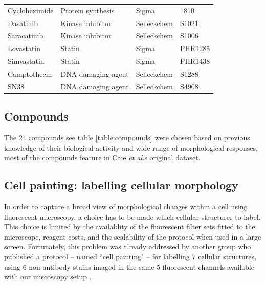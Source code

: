 \documentclass[a4paper,11pt,twoside,openright]{scrbook}
\begin{document}
\begin{table}[]
\begin{footnotesize}
\begin{tabular}{@{}llll@{}}
    Cycloheximide   & Protein synthesis      & Sigma       & 1810        \\
    Dasatinib       & Kinase inhibitor       & Selleckchem & S1021       \\
    Saracatinib     & Kinase inhibitor       & Selleckchem & S1006       \\
    Lovastatin      & Statin                 & Sigma       & PHR1285     \\
    Simvastatin     & Statin                 & Sigma       & PHR1438     \\
    Camptothecin    & DNA damaging agent     & Selleckchem & S1288       \\
    SN38            & DNA damaging agent     & Selleckchem & S4908       \\ \bottomrule
    \end{tabular}
    \end{footnotesize}
\end{table}





\subsection{Compounds}
The 24 compounds see table \ref{table:compounds} were chosen based on previous knowledge of their biological activity and wide range of morphological responses, most of the compounds feature in Caie \textit{et al.}s original dataset.


\subsection{Cell painting: labelling cellular morphology}
In order to capture a broad view of morphological changes within a cell using fluorescent microscopy, a choice has to be made which cellular structures to label.
This choice is limited by the availablity of the fluorescent filter sets fitted to the microscope, reagent costs, and the scalability of the protocol when used in a large screen.
Fortunately, this problem was already addressed by another group who published a protocol -- named ``cell painting" -- for labelling 7 cellular structures, using 6 non-antibody stains imaged in the same 5 fluorescent channels available with our miscoscopy setup \cite{Gustafsdottir2013, Bray2016}.
\end{document}

